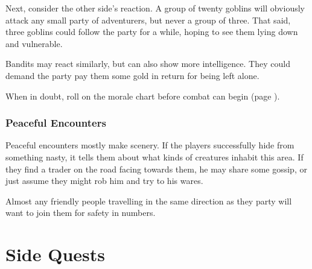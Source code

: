 \begin{multicols}{2}
Next, consider the other side's reaction.
A group of twenty goblins will obviously attack any small party of adventurers, but never a group of three.
That said, three goblins could follow the party for a while, hoping to see them lying down and vulnerable.

Bandits may react similarly, but can also show more intelligence.
They could demand the party pay them some gold in return for being left alone.

When in doubt, roll on the morale chart before combat can begin (page \pageref{morale}).

\subsubsection{Peaceful Encounters}

Peaceful encounters mostly make scenery.
If the players successfully hide from something nasty, it tells them about what kinds of creatures inhabit this area.
If they find a trader on the road facing towards them, he may share some gossip, or just assume they might rob him and try to his wares.

Almost any friendly people travelling in the same direction  as they party will want to join them for safety in numbers.

\end{multicols}

\section{Side Quests}\label{sidequests}


